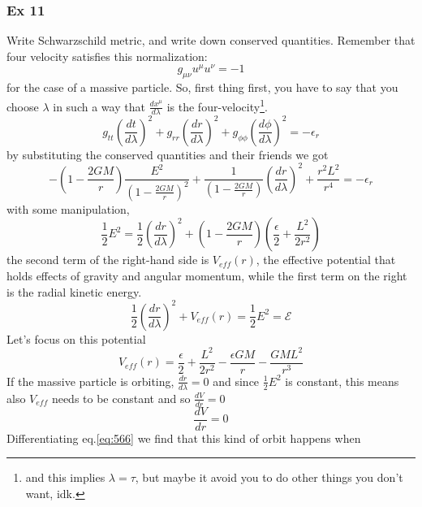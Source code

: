 \subsubsection{Ex 11}
 Write Schwarzschild metric, and write down conserved quantities. Remember that four velocity satisfies this normalization:
 \[
 g_{\mu \nu }u^{\mu }u^{\nu } = -1
 \]
 for the case of a massive particle. So, first thing first, you have to say that you choose $\lambda $ in such a way that $ \frac{d x^{\mu }}{d \lambda }$ is the four-velocity\footnote{and this implies $\lambda =\tau $, but maybe it avoid you to do other things you don't want, idk.}.
\begin{equation}
g_{tt}\left( \frac{d t}{d \lambda } \right)^{2} + g_{rr}\left( \frac{d r}{d \lambda } \right)^{2} + g_{\phi \phi }\left( \frac{d \phi }{d \lambda } \right)^{2}  = - \epsilon_{r}
\end{equation}
by substituting the conserved quantities and their friends we got
\begin{equation}
-\left( 1- \frac{2GM}{r} \right) \frac{E^{2}}{\left( 1- \frac{2GM}{r} \right)^{2}} + \frac{1}{\left( 1 - \frac{2GM}{r} \right)}\left( \frac{d r}{d \lambda }\right)^{2} + \frac{r^{2}L^{2}}{r^{4}} = - \epsilon_{r}
\end{equation}
with some manipulation,
\begin{equation}
\frac{1}{2}E^{2} = \frac{1}{2} \left( \frac{d r}{d \lambda } \right)^{2} + \left( 1- \frac{2GM}{r} \right)\left( \frac{\epsilon }{2} + \frac{L^{2}}{2r^{2}} \right)
\end{equation}
the second term of the right-hand side is $V_{eff}\left( r \right)$, the effective potential that holds effects of gravity and angular momentum, while the first term on the right is the radial kinetic energy.
\begin{equation}
\frac{1}{2} \left( \frac{d r}{d \lambda } \right)^{2} + V_{eff}\left( r \right) = \frac{1}{2}E^{2} = \mathcal{E} 
\end{equation}
Let's focus on this potential
\begin{equation}\label{eq:566}
V_{eff}\left( r \right) = \frac{\epsilon }{2} + \frac{L^{2}}{2r^{2}}- \frac{\epsilon GM}{r} - \frac{GML^{2}}{r^{3}}
\end{equation}
If the massive particle is orbiting, $\frac{d r}{d \lambda } = 0$ and since $\frac{1}{2}E^{2}$ is constant, this means also $V_{eff}$ needs to be constant and so $\frac{d V}{d r} = 0$
\[
\frac{d V}{d r} = 0
\]
Differentiating eq.\ref{eq:566} we find that this kind of orbit happens when
